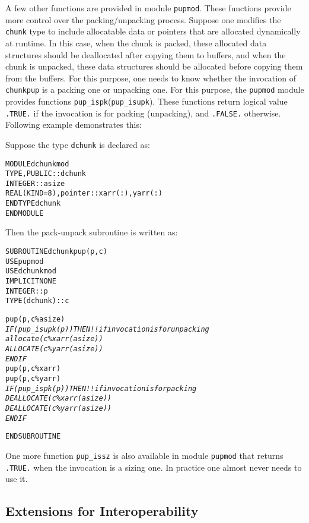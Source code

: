 \documentclass[10pt]{article}
\begin{document}
A few other functions are provided in module \texttt{pupmod}. These functions
provide more control over the packing/unpacking process. Suppose one modifies
the \texttt{chunk} type to include allocatable data or pointers that are
allocated dynamically at runtime. In this case, when the chunk is packed, these
allocated data structures should be deallocated after copying them to buffers,
and when the chunk is unpacked, these data structures should be allocated
before copying them from the buffers.  For this purpose, one needs to know
whether the invocation of \texttt{chunkpup} is a packing one or unpacking one.
For this purpose, the \texttt{pupmod} module provides functions
\verb+pup_ispk+(\verb+pup_isupk+). These functions return logical value
\verb+.TRUE.+ if the invocation is for packing (unpacking), and \verb+.FALSE.+
otherwise. Following example demonstrates this:

Suppose the type \texttt{dchunk} is declared as:

\begin{alltt}
MODULE dchunkmod
  TYPE, PUBLIC :: dchunk
      INTEGER :: asize
      REAL(KIND=8), pointer :: xarr(:), yarr(:)
  END TYPE dchunk
END MODULE
\end{alltt}

Then the pack-unpack subroutine is written as:

\begin{alltt}
SUBROUTINE dchunkpup(p, c)
  USE pupmod
  USE dchunkmod
  IMPLICIT NONE
  INTEGER :: p
  TYPE(dchunk) :: c

  pup(p, c\%asize)
  \emph{
  IF (pup_isupk(p)) THEN       !! if invocation is for unpacking
    allocate(c\%xarr(asize))
    ALLOCATE(c\%yarr(asize))
  ENDIF
  }
  pup(p, c\%xarr)
  pup(p, c\%yarr)
  \emph{
  IF (pup_ispk(p)) THEN        !! if invocation is for packing
    DEALLOCATE(c\%xarr(asize))
    DEALLOCATE(c\%yarr(asize))
  ENDIF
  }

END SUBROUTINE
\end{alltt}

One more function \verb+pup_issz+ is also available in module \texttt{pupmod}
that returns \verb+.TRUE.+ when the invocation is a sizing one. In practice one
almost never needs to use it.

\subsection{Extensions for Interoperability}
\end{document}
